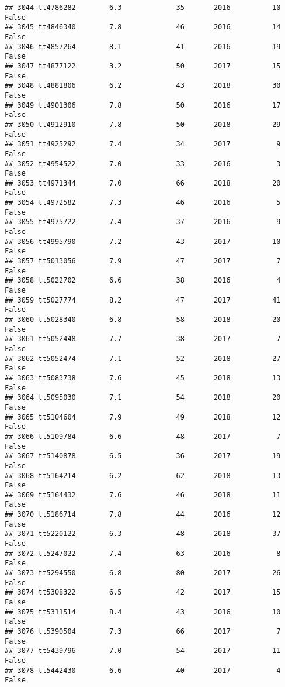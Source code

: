 \documentclass[
]{article}
\begin{document}
\begin{verbatim}
## 3044 tt4786282        6.3             35       2016          10   False
## 3045 tt4846340        7.8             46       2016          14   False
## 3046 tt4857264        8.1             41       2016          19   False
## 3047 tt4877122        3.2             50       2017          15   False
## 3048 tt4881806        6.2             43       2018          30   False
## 3049 tt4901306        7.8             50       2016          17   False
## 3050 tt4912910        7.8             50       2018          29   False
## 3051 tt4925292        7.4             34       2017           9   False
## 3052 tt4954522        7.0             33       2016           3   False
## 3053 tt4971344        7.0             66       2018          20   False
## 3054 tt4972582        7.3             46       2016           5   False
## 3055 tt4975722        7.4             37       2016           9   False
## 3056 tt4995790        7.2             43       2017          10   False
## 3057 tt5013056        7.9             47       2017           7   False
## 3058 tt5022702        6.6             38       2016           4   False
## 3059 tt5027774        8.2             47       2017          41   False
## 3060 tt5028340        6.8             58       2018          20   False
## 3061 tt5052448        7.7             38       2017           7   False
## 3062 tt5052474        7.1             52       2018          27   False
## 3063 tt5083738        7.6             45       2018          13   False
## 3064 tt5095030        7.1             54       2018          20   False
## 3065 tt5104604        7.9             49       2018          12   False
## 3066 tt5109784        6.6             48       2017           7   False
## 3067 tt5140878        6.5             36       2017          19   False
## 3068 tt5164214        6.2             62       2018          13   False
## 3069 tt5164432        7.6             46       2018          11   False
## 3070 tt5186714        7.8             44       2016          12   False
## 3071 tt5220122        6.3             48       2018          37   False
## 3072 tt5247022        7.4             63       2016           8   False
## 3073 tt5294550        6.8             80       2017          26   False
## 3074 tt5308322        6.5             42       2017          15   False
## 3075 tt5311514        8.4             43       2016          10   False
## 3076 tt5390504        7.3             66       2017           7   False
## 3077 tt5439796        7.0             54       2017          11   False
## 3078 tt5442430        6.6             40       2017           4   False

\end{verbatim}
\end{document}
